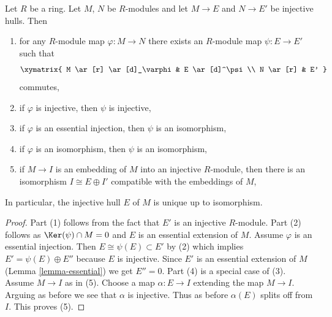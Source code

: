 \begin{lemma}
\label{lemma-injective-hull-unique}
Let $R$ be a ring. Let $M$, $N$ be $R$-modules and let $M \to E$
and $N \to E'$ be injective hulls. Then
\begin{enumerate}
\item for any $R$-module map $\varphi : M \to N$ there exists an
$R$-module map $\psi : E \to E'$ such that
$$
\xymatrix{
M \ar[r] \ar[d]_\varphi & E \ar[d]^\psi \\
N \ar[r] & E'
}
$$
commutes,
\item if $\varphi$ is injective, then $\psi$ is injective,
\item if $\varphi$ is an essential injection, then $\psi$ is an isomorphism,
\item if $\varphi$ is an isomorphism, then $\psi$ is an isomorphism,
\item if $M \to I$ is an embedding of $M$ into an injective $R$-module,
then there is an isomorphism $I \cong E \oplus I'$ compatible with
the embeddings of $M$,
\end{enumerate}
In particular, the injective hull $E$ of $M$ is unique up to isomorphism.
\end{lemma}

\begin{proof}
Part (1) follows from the fact that $E'$ is an injective $R$-module.
Part (2) follows as $\Ker(\psi) \cap M = 0$
and $E$ is an essential extension of $M$.
Assume $\varphi$ is an essential injection. Then
$E \cong \psi(E) \subset E'$ by (2) which implies
$E' = \psi(E) \oplus E''$ because $E$ is injective.
Since $E'$ is an essential extension of
$M$ (Lemma \ref{lemma-essential}) we get $E'' = 0$.
Part (4) is a special case of (3).
Assume $M \to I$ as in (5).
Choose a map $\alpha : E \to I$ extending the map $M \to I$.
Arguing as before we see that $\alpha$ is injective.
Thus as before $\alpha(E)$ splits off from $I$.
This proves (5).
\end{proof}
